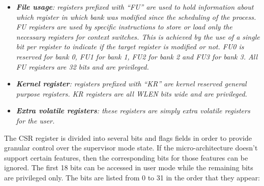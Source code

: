 \begin{itemize}
                \item \textit{\textbf{File usage}: registers prefixed with ``FU'' are used to hold information about which register in which bank was modified since the scheduling of the process. FU registers are used by specific instructions to store or load only the necessary registers for context switches. This is achieved by the use of a single bit per register to indicate if the target register is modified or not. FU0 is reserved for bank 0, FU1 for bank 1, FU2 for bank 2 and FU3 for bank 3. All FU registers are 32 bits and are privileged.}

                \item \textit{\textbf{Kernel register}: registers prefixed with ``KR'' are kernel reserved general purpose registers. KR registers are all WLEN bits wide and are privileged.}

                \item \textit{\textbf{Extra volatile registers}: these registers are simply extra volatile registers for the user.}

            \end{itemize}

            The CSR register is divided into several bits and flags fields in order to provide granular control over the supervisor mode state. If the micro-architecture doesn't support certain features, then the corresponding bits for those features can be ignored. The first 18 bits can be accessed in user mode while the remaining bits are privileged only. The bits are listed from 0 to 31 in the order that they appear:

